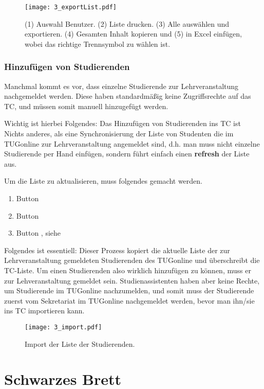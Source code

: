 \begin{figure}[htbp]
  \texttt{[image: 3\_exportList.pdf]}
  \caption{ (1) Auswahl Benutzer. (2) Liste drucken. (3) Alle ausw\"{a}hlen und
    exportieren. (4) Gesamten Inhalt kopieren und (5) in Excel einf\"{u}gen,
    wobei das richtige Trennsymbol zu w\"{a}hlen ist.}
  \label{fig:export}
\end{figure}

\subsubsection{Hinzufügen von Studierenden}

Manchmal kommt es vor, dass einzelne Studierende zur Lehrveranstaltung
nachgemeldet werden. Diese haben standardmäßig keine Zugriffsrechte auf das
TC, und müssen somit manuell hinzugefügt werden.

Wichtig ist hierbei Folgendes: Das 
\glqq{}Hinzufügen von Studierenden ins TC\grqq{} ist Nichts anderes, als eine 
Synchronisierung der Liste von Studenten die im TUGonline zur Lehrveranstaltung 
angemeldet sind, d.h. man muss nicht einzelne Studierende per Hand einfügen, 
sondern führt einfach einen {\bf refresh} der Liste aus.

Um die Liste zu aktualisieren, muss folgendes gemacht werden.
\begin{enumerate}
\item Button 
\item Button 
\item Button , siehe 
\end{enumerate}

Folgendes ist essentiell: Dieser Prozess kopiert die aktuelle Liste der zur
Lehrveranstaltung gemeldeten Studierenden des TUGonline und überschreibt die
TC-Liste. Um einen Studierenden also wirklich hinzufügen zu können, muss er zur
Lehveranstaltung gemeldet sein. Studienassistenten haben aber keine Rechte, um
Studierende im TUGonline nachzumelden, und somit muss der Studierende zuerst
vom Sekretariat im TUGonline  nachgemeldet werden, bevor man ihn/sie ins TC
importieren kann.

\begin{figure}[htbp]
  \texttt{[image: 3\_import.pdf]}
  \caption{ Import der Liste der Studierenden.}
  \label{fig:import}
\end{figure}

\section{Schwarzes Brett}

